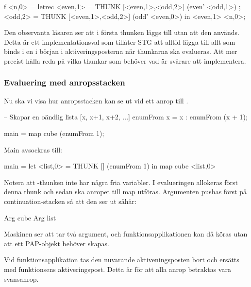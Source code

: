 \documentclass[../Core]{subfiles}
\begin{document}
\begin{codeEx}
f <n,0> = letrec 
    { <even,1> = THUNK [<even,1>,<odd,2>] (even' <odd,1>)
    ; <odd,2>  = THUNK [<even,1>,<odd,2>] (odd' <even,0>)
    } in <even,1> <n,0>;
\end{codeEx}

Den observanta läsaren ser att i första thunken läggs  till utan att den används. 
Detta är ett implementationsval som tillåter STG att alltid lägga till allt som 
binds i en  i början i aktiveringsposterna när thunkarna ska evalueras. 
Att mer precist hålla reda på vilka thunkar som behöver vad är svårare att implementera.




\subsubsection{Evaluering med anropsstacken}


Nu ska vi visa hur anropsstacken kan se ut vid ett anrop till .


\begin{codeEx}
-- Skapar en oändlig lista [x, x+1, x+2, ...]
enumFrom x = x : enumFrom (x + 1);

main = map cube (enumFrom 1);
\end{codeEx}

Main avsockras till:
\begin{codeEx}
main = let <list,0> = THUNK [] (enumFrom 1)
       in  map cube <list,0>
\end{codeEx}
Notera att -thunken inte har några fria variabler.
I evalueringen allokeras först denna thunk och sedan ska anropet till map
utföras. 
Argumenten pushas först på continuation-stacken så att den ser ut såhär:
\begin{codeEx}
Arg cube
Arg list
\end{codeEx}

Maskinen ser att  tar två argument, och funktionsapplikationen 
kan då köras utan att ett PAP-objekt behöver skapas.

Vid funktionsapplikation tas den nuvarande aktiveningsposten bort och ersätts 
med funktionsens aktiveringspost. Detta är för att alla anrop betraktas vara
svansanrop.
\end{document}
